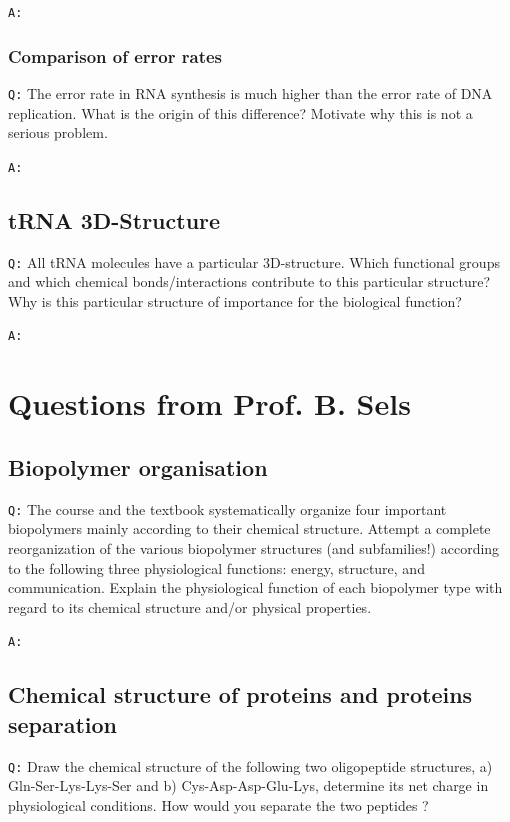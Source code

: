 \documentclass[11pt, a4paper,titlepage]{article}
\begin{document}
\texttt{A:}
\subsubsection{Comparison of error rates}
\label{sec-1-2-5}

\texttt{Q:} The error rate in RNA synthesis is much higher than the error rate
of DNA replication. What is the origin of this difference? Motivate
why this is not a serious problem.

\texttt{A:}
\subsection{tRNA 3D-Structure}
\label{sec-1-3}

\texttt{Q:} All tRNA molecules have a particular 3D-structure. Which
functional groups and which chemical bonds/interactions contribute to
this particular structure? Why is this particular structure of
importance for the biological function?

\texttt{A:}
\section{Questions from Prof. B. Sels}
\label{sec-2}
\subsection{Biopolymer organisation}
\label{sec-2-1}

\texttt{Q:} The course and the textbook systematically organize four important
biopolymers mainly according to their chemical structure. Attempt a
complete reorganization of the various biopolymer structures (and
subfamilies!) according to the following three physiological
functions: energy, structure, and communication. Explain the
physiological function of each biopolymer type with regard to its
chemical structure and/or physical properties.

\texttt{A:}
\subsection{Chemical structure of proteins and proteins separation}
\label{sec-2-2}

\texttt{Q:} Draw the chemical structure of the following two oligopeptide
structures, a) Gln-Ser-Lys-Lys-Ser and b) Cys-Asp-Asp-Glu-Lys,
determine its net charge in physiological conditions. How would you
separate the two peptides ?  
\end{document}
